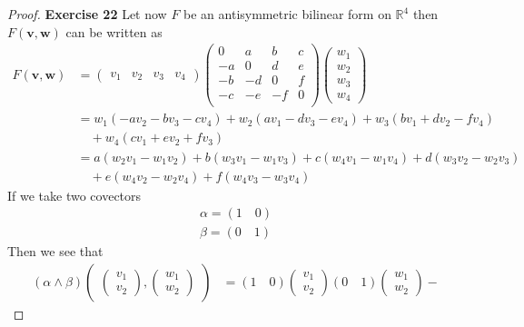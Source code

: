 \documentclass[11pt]{article}
\newcommand{\R}{\mathbb{R}}
\theoremstyle{definition}
\begin{document}
\begin{proof}{\textbf{Exercise 22}}
    Let now $F$ be an antisymmetric bilinear form on $\R^4$ then
    $F(\bm{v},\bm{w})$ can be written as
    \begin{align*}
        F(\bm{v}, \bm{w}) &= \begin{pmatrix} v_1 & v_2 & v_3 & v_4 \end{pmatrix}
        \begin{pmatrix}
            0 & a & b & c\\
            -a & 0 & d & e\\
            -b & -d & 0 & f\\
            -c & -e & -f & 0\\
        \end{pmatrix}
        \begin{pmatrix} w_1 \\ w_2 \\ w_3\\ w_4\end{pmatrix}\\
        &= w_1(-av_2 -bv_3 -cv_4) + w_2(av_1 -dv_3 -ev_4) + w_3(bv_1 + dv_2 -fv_4)\\
        &\quad + w_4(cv_1 + ev_2 + fv_3)\\
        &= a(w_2v_1-w_1v_2) + b(w_3v_1-w_1v_3) + c(w_4v_1-w_1v_4) + d(w_3v_2-w_2v_3)\\
        &\quad + e(w_4v_2-w_2v_4) + f(w_4v_3-w_3v_4)
    \end{align*}
    If we take two covectors
    \begin{align*}
        \alpha = (1\quad 0)\\
        \beta = (0\quad 1)
    \end{align*}
    Then we see that 
    \begin{align*}
        (\alpha\wedge\beta)\begin{pmatrix}
            \begin{pmatrix} v_1\\ v_2 \end{pmatrix},
            \begin{pmatrix} w_1\\ w_2 \end{pmatrix}
        \end{pmatrix}
        &= (1\quad 0)\begin{pmatrix} v_1\\ v_2 \end{pmatrix}
        (0\quad 1)\begin{pmatrix} w_1\\ w_2 \end{pmatrix} -

\end{align*}
\end{proof}
\end{document}
